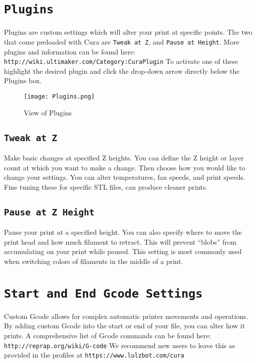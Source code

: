 \section{\texttt{Plugins}}
Plugins are custom settings which will alter your print at specific points. The two that come preloaded with Cura are \texttt{Tweak at Z}, and \texttt{Pause at Height}. More plugins and information can be found here: \texttt{http://wiki.ultimaker.com/Category:CuraPlugin} To activate one of these highlight the desired plugin and click the drop-down arrow directly below the Plugins box. 
\begin{figure}[H]
\centering
\texttt{[image: Plugins.png]}
\caption{View of Plugins}
\label{fig:Plugins}
\end{figure}

\subsection{\texttt{Tweak at Z}}
Make basic changes at specified Z heights. You can define the Z height or layer count at which you want to make a change. Then choose how you would like to change your settings. You can alter temperatures, fan speeds, and print speeds. Fine tuning these for specific STL files, can produce cleaner prints.

\subsection{\texttt{Pause at Z Height}}
Pause your print at a specified height. You can also specify where to move the print head and how much filament to retract. This will prevent “blobs” from accumulating on your print while paused. This setting is most commonly used when switching colors of filaments in the middle of a print.

\section{\texttt{Start and End Gcode Settings}}
Custom Gcode allows for complex automatic printer movements and operations. By adding custom Gcode into the start or end of your file, you can alter how it prints. A comprehensive list of Gcode commands can be found here: \texttt{http://reprap.org/wiki/G-code} We recommend new users to leave this as provided in the profiles at \texttt{https://www.lulzbot.com/cura}

